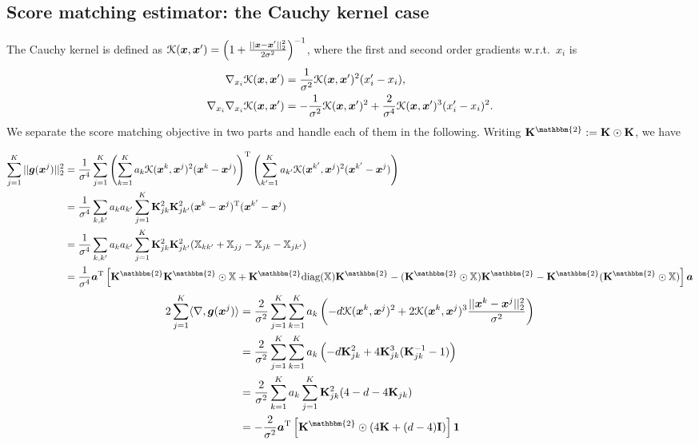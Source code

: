 \subsection{Score matching estimator: the Cauchy kernel case}
The Cauchy kernel is defined as $\mathcal{K}(\bm{x}, \bm{x}') = \left(1 + \frac{|| \bm{x} - \bm{x}' ||_2^2}{2 \sigma^2} \right)^{-1}$, where the first and second order gradients w.r.t.~$x_i$ is
\begin{equation*}
\begin{aligned}
\nabla_{x_i} \mathcal{K}(\bm{x}, \bm{x}') &= \frac{1}{\sigma^2} \mathcal{K}(\bm{x}, \bm{x}')^2 (x'_i - x_i), \\ 
\nabla_{x_i} \nabla_{x_i} \mathcal{K}(\bm{x}, \bm{x}') &= -\frac{1}{\sigma^2} \mathcal{K}(\bm{x}, \bm{x}')^2 + \frac{2}{\sigma^4} \mathcal{K}(\bm{x}, \bm{x}')^3 (x'_i - x_i)^2.
\end{aligned}
\end{equation*}
We separate the score matching objective in two parts and handle each of them in the following. Writing $\K^{\mathbbm{2}} := \K \odot \K$, we have

\begin{equation*}
\begin{aligned}
\sum_{j=1}^K || \g(\x^j) ||_2^2 &= \frac{1}{\sigma^4} \sum_{j=1}^K \left( \sum_{k=1}^K a_k \mathcal{K}(\x^k, \x^j)^2 (\x^k - \x^j) \right)^{\text{T}} \left( \sum_{k'=1}^K a_{k'} \mathcal{K}(\x^{k'}, \x^j)^2 (\x^{k'} - \x^j) \right) \\
&= \frac{1}{\sigma^4} \sum_{k, k'} a_k a_{k'} \sum_{j=1}^K \K^2_{jk} \K^2_{jk'} (\x^k - \x^j)^{\text{T}} (\x^{k'} - \x^j) \\
&= \frac{1}{\sigma^4} \sum_{k, k'} a_k a_{k'} \sum_{j=1}^K \K^2_{jk} \K^2_{jk'} (\mathbb{X}_{kk'} + \mathbb{X}_{jj} - \mathbb{X}_{jk} - \mathbb{X}_{jk'}) \\
&= \frac{1}{\sigma^4} \bm{a}^{\text{T}} \left[ \K^{\mathbbm{2}} \K^{\mathbbm{2}} \odot \mathbb{X} + \K^{\mathbbm{2}} \text{diag}(\mathbb{X}) \K^{\mathbbm{2}} - (\K^{\mathbbm{2}} \odot \mathbb{X}) \K^{\mathbbm{2}} - \K^{\mathbbm{2}} (\K^{\mathbbm{2}} \odot \mathbb{X}) \right] \bm{a}
\end{aligned}
\end{equation*}
%
\begin{equation*}
\begin{aligned}
2 \sum_{j=1}^K \langle \nabla, \g(\x^j) \rangle &= \frac{2}{\sigma^2} \sum_{j=1}^K \sum_{k=1}^K a_k \left( - d \mathcal{K}(\x^k, \x^j)^2 + 2 \mathcal{K}(\x^k, \x^j)^3 \frac{ ||\x^k - \x^j ||_2^2 }{\sigma^2} \right) \\
&= \frac{2}{\sigma^2} \sum_{j=1}^K \sum_{k=1}^K a_k \left( - d \K_{jk}^2 + 4 \K_{jk}^3 (\K_{jk}^{-1} - 1) \right) \\
&= \frac{2}{\sigma^2} \sum_{k=1}^K a_k \sum_{j=1}^K \K_{jk}^2 (4 - d - 4 \K_{jk}) \\
&= -\frac{2}{\sigma^2} \bm{a}^{\text{T}} \left[ \K^{\mathbbm{2}} \odot (4 \K + (d - 4)\mathbf{I}) \right] \bm{1}
\end{aligned}
\end{equation*}

